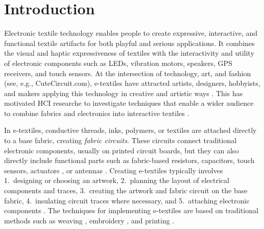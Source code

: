 \documentclass[header.tex]{subfiles}
\begin{document}

\keywords{\plainkeywords}

\section{Introduction}


Electronic textile technology enables people to create expressive, interactive, and functional textile artifacts for both playful and serious applications.
It combines the visual and haptic expressiveness of textiles with the interactivity and utility of electronic components such as LEDs, vibration motors, speakers, GPS receivers, and touch sensors. At the intersection of technology, art, and fashion (see, e.g., CuteCircuit.com), e-textiles have attracted artists, designers, hobbyists, and makers applying this technology in creative and artistic ways \cite{berzowska2005kukkia,Buechley:2010:LWH:1858171.1858206}. 
This has motivated HCI researche to investigate techniques that enable a wider audience to combine fabrics and electronics into interactive textiles \cite{Buechley2009,perner2011handcrafting,5387040}.

In e-textiles, conductive threads, inks, polymers, or textiles are attached directly to a base fabric, creating \textit{fabric circuits}. These circuits connect traditional electronic components, usually on printed circuit boards, but they can also directly include functional parts such as fabric-based resistors, capacitors, touch sensors, actuators \cite{stylios2007shape}, or antennas \cite{catrysse2004towards}.
Creating e-textiles typically involves 1.\ designing or choosing an artwork, 2.\ planning the layout of electrical components and traces, 3.\ creating the artwork and fabric circuit on the base fabric, 4.\ insulating circuit traces where necessary, and 5.\ attaching electronic components \cite{Lovell:2010:ETD:1810543.1810578}. 
The techniques for implementing e-textiles are based on traditional methods such as weaving \cite{kallmayer2003new}, embroidery \cite{5387040}, and printing \cite{kim2010electrical}.

\end{document}
